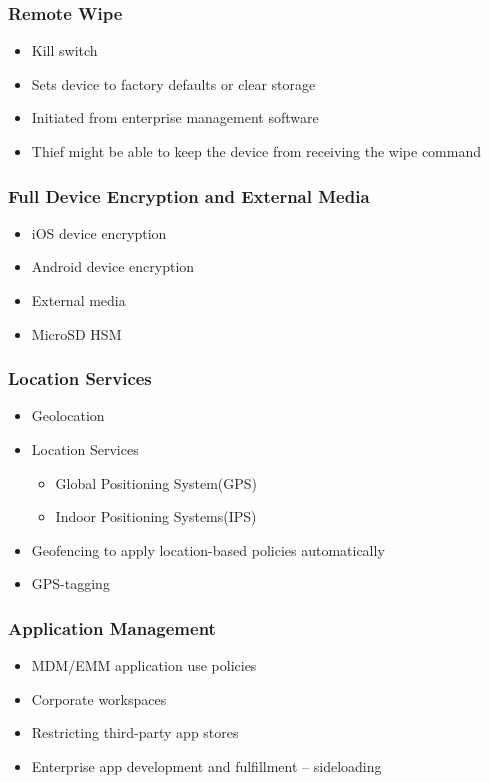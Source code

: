 		\subsubsection {Remote Wipe}
			\begin{itemize}
				\item Kill switch
				\item Sets device to factory defaults or clear storage
				\item Initiated from enterprise management software
				\item Thief might be able to keep the device from receiving
					the wipe command
			\end{itemize}
		\subsubsection {Full Device Encryption and External Media}
			\begin{itemize}
				\item iOS device encryption
				\item Android device encryption
				\item External media
				\item MicroSD HSM
			\end{itemize}
		\subsubsection {Location Services}
			\begin{itemize}
				\item Geolocation
				\item Location Services
					\begin{itemize}
						\item Global Positioning System(GPS)
						\item Indoor Positioning Systems(IPS)
					\end{itemize}
				\item Geofencing to apply location-based policies automatically
				\item GPS-tagging
			\end{itemize}
		\subsubsection {Application Management}
			\begin{itemize}
				\item MDM/EMM application use policies
				\item Corporate workspaces
				\item Restricting third-party app stores
				\item Enterprise app development and fulfillment -- sideloading
			\end{itemize}
